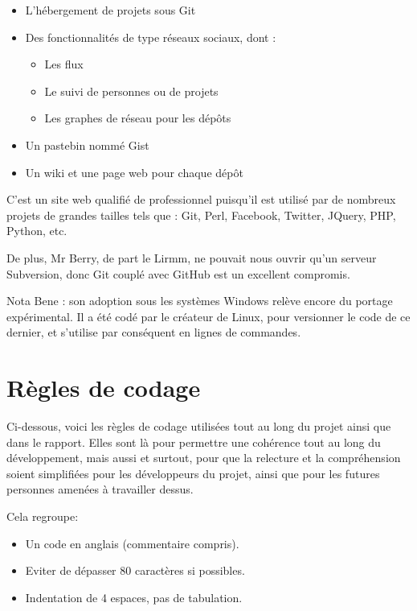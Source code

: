     \begin{itemize}
    \item L'hébergement de projets sous Git
    \item Des fonctionnalités de type réseaux sociaux, dont :
        \begin{itemize}
        \item Les flux
        \item Le suivi de personnes ou de projets
        \item Les graphes de réseau pour les dépôts
        \end{itemize}
    \item Un pastebin nommé Gist
    \item Un wiki et une page web pour chaque dépôt
    \end{itemize}

C'est un site web qualifié de professionnel puisqu'il est utilisé par de 
nombreux projets de grandes tailles tels que : Git, Perl, Facebook, Twitter,
JQuery, PHP, Python, etc.

De plus, Mr Berry, de part le Lirmm, ne pouvait nous ouvrir qu'un serveur
Subversion, donc Git couplé avec GitHub est un excellent compromis.

Nota Bene : son adoption sous les systèmes Windows relève encore du portage
expérimental. Il a été codé par le créateur de Linux, pour versionner le code
de ce dernier, et s'utilise par conséquent en lignes de commandes.

\newpage

    \section{Règles de codage}

Ci-dessous, voici les règles de codage utilisées tout au long du projet
ainsi que dans le rapport. Elles sont là pour permettre une cohérence tout au
long du développement, mais aussi et surtout, pour que la relecture et la 
compréhension soient simplifiées pour les développeurs du projet, ainsi que pour les
futures personnes amenées à travailler dessus.

Cela regroupe:

    \begin{itemize}
    \item Un code en anglais (commentaire compris).
    \item Eviter de dépasser 80 caractères si possibles.
    \item Indentation de 4 espaces, pas de tabulation.
    \end{itemize}

